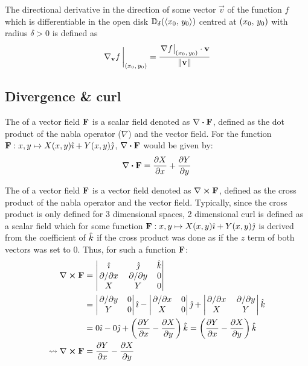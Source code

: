 \begin{defn}
	The directional derivative in the direction of some vector $\vec{v}$ of the function $f$ which is differentiable in
	the open disk $\mathbb{D}_\delta(\langle x_0,\,y_0\rangle)$ centred at $\left(x_0,\,y_0\right)$ with radius $\delta>0$ is defined as
	$$
		\eval{\nabla_{\vec{v}}f\,}_{\point{x_0}{y_0}}=\frac{\eval{\nabla f}_{\point{x_0}{y_0}}\cdot\vec{v}}{\lVert\vec{v}\rVert}
	$$
	\cite{GIANNAKIDIS2010129}
\end{defn}

\subsection{Divergence \& curl}
\begin{defn}
	The  of a vector field $\mathbf{F}$ is a scalar field denoted as $\divergence{\fatf}$, defined as the dot product
	of the nabla operator ($\nabla$) and the vector field. For the function $\mathbf{F}:x,y\mapsto X(x,y)\hat{\imath}+Y(x,y)\hat{\jmath}$, $\divergence{\fatf}$
	would be given by:
	$$
		\divergence{\fatf}=\pdv{X}{x}+\pdv{Y}{y}
	$$
\end{defn}
\begin{defn}
	The  of a vector field $\mathbf{F}$ is a vector field denoted as $\curl{\fatf}$, defined as the cross product of the
	nabla operator and the vector field. Typically, since the cross product is only defined for 3 dimensional spaces, 2 dimensional curl is defined
	as a scalar field which for some function $\mathbf{F}:x,y\mapsto X(x,y)\hat{\imath}+Y(x,y)\hat{\jmath}$ is derived from the coefficient of $\hat{k}$ if the cross
	product was done as if the $z$ term of both vectors was set to 0. Thus, for such a function $\mathbf{F}$:
	\begin{align*}
		\curl{\fatf}&=\begin{vmatrix}
			\ihat&\jhat&\khat\\
			\pdv*{x}&\pdv*{y}&0\\
			X&Y&0
		\end{vmatrix}\\
		&=\begin{vmatrix}
			\pdv*{y}&0\\
			Y&0
		\end{vmatrix}\ihat
		-\begin{vmatrix}
			\pdv*{x}&0\\
			X&0
		\end{vmatrix}\jhat
		+\begin{vmatrix}
			\pdv*{x}&\pdv*{y}\\
			X&Y
		\end{vmatrix}\khat\\
		&=0\ihat-0\jhat+\left(\pdv{Y}{x}-\pdv{X}{y}\right)\khat=\left(\pdv{Y}{x}-\pdv{X}{y}\right)\khat\\
		\leadsto\curl{\fatf}&=\pdv{Y}{x}-\pdv{X}{y}
	\end{align*}
\end{defn}